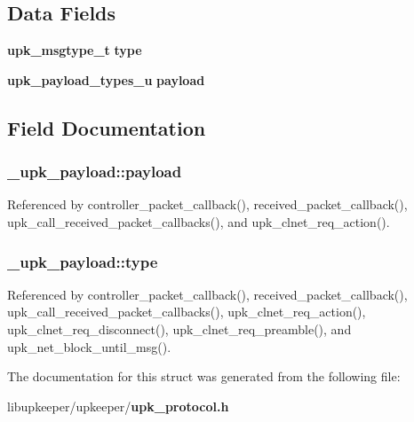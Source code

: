 \subsection*{Data Fields}
\begin{DoxyCompactItemize}
\item 
{\bf upk\_\-msgtype\_\-t} {\bf type}
\item 
{\bf upk\_\-payload\_\-types\_\-u} {\bf payload}
\end{DoxyCompactItemize}


\subsection{Field Documentation}
\subsubsection[{payload}]{ {\bf \_\-upk\_\-payload::payload}}\label{struct__upk__payload_a22f7f03c4df6792a307fe00cd8a72dbb}


Referenced by controller\_\-packet\_\-callback(), received\_\-packet\_\-callback(), upk\_\-call\_\-received\_\-packet\_\-callbacks(), and upk\_\-clnet\_\-req\_\-action().

\subsubsection[{type}]{ {\bf \_\-upk\_\-payload::type}}\label{struct__upk__payload_ac6a896e3a9a5ecf0efdc6c092f959d1c}


Referenced by controller\_\-packet\_\-callback(), received\_\-packet\_\-callback(), upk\_\-call\_\-received\_\-packet\_\-callbacks(), upk\_\-clnet\_\-req\_\-action(), upk\_\-clnet\_\-req\_\-disconnect(), upk\_\-clnet\_\-req\_\-preamble(), and upk\_\-net\_\-block\_\-until\_\-msg().



The documentation for this struct was generated from the following file:\begin{DoxyCompactItemize}
\item 
libupkeeper/upkeeper/{\bf upk\_\-protocol.h}\end{DoxyCompactItemize}
